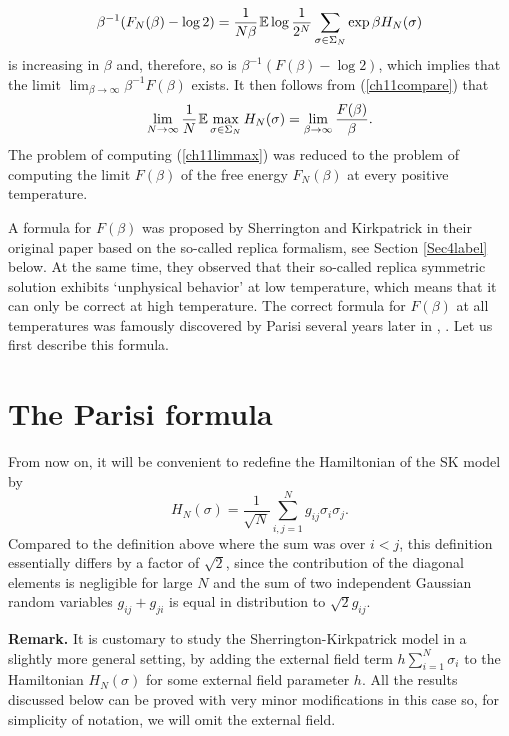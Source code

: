 \documentclass[12pt]{article}
\newcommand{\smsp}{\hspace{0.3mm}}
\newcommand{\e}{\mathbb{E}}
\theoremstyle{nonumberplain}
\begin{document}
$$
\beta^{-1}(F_N(\beta) - \log 2) =
\frac{1}{N\beta}\smsp \e \log \frac{1}{2^{N}}\sum_{\sigma\in\Sigma_N} \exp \beta H_N(\sigma)
$$
is increasing in $\beta$ and, therefore, so is $\beta^{-1}(F(\beta) - \log 2)$, which  implies that the limit $\lim_{\beta\to\infty}\beta^{-1} F(\beta)$ exists. It then follows from (\ref{ch11compare}) that
\begin{equation}
\lim_{N\to\infty} \frac{1}{N}\smsp \e \max_{\sigma\in\Sigma_N} H_N(\sigma)
=
\lim_{\beta\to\infty}\frac{F(\beta)}{\beta}.
\label{ch11limmaxF}
\end{equation}
The problem of computing (\ref{ch11limmax}) was reduced to the problem of computing the limit $F(\beta)$ of the free energy $F_N(\beta)$ at every positive temperature. 

A formula for $F(\beta)$ was proposed by Sherrington and Kirkpatrick in their original paper \cite{SK} based on the so-called replica formalism, see Section \ref{Sec4label} below. At the same time, they observed that their so-called replica symmetric solution exhibits `unphysical behavior' at low temperature, which means that it can only be correct at high temperature. The correct formula for $F(\beta)$ at all temperatures was famously discovered by Parisi several years later in \cite{Parisi79}, \cite{Parisi}. Let us first describe this formula.






\section{The Parisi formula}

From now on, it will be convenient to redefine the Hamiltonian of the SK model by 
\begin{equation}
H_N(\sigma) = \frac{1}{\sqrt{N}} \sum_{i,j =1}^N g_{ij}\sigma_i \sigma_j.
\label{SKH}
\end{equation}
Compared to the definition above where the sum was over $i<j$, this definition essentially differs by a factor of $\sqrt{2}$, since the contribution of the diagonal elements is negligible for large $N$ and the sum of two independent Gaussian random variables $g_{ij}+g_{ji}$ is equal in distribution to $\sqrt{2} g_{ij}$.

\medskip
\noindent
\textbf{Remark.} It is customary to study the Sherrington-Kirkpatrick model in a slightly more general setting, by adding the external field term $h \sum_{i=1}^N \sigma_i$ to the Hamiltonian $H_N(\sigma)$ for some external field parameter $h.$ All the results discussed below can be proved with very minor modifications in this case so, for simplicity of notation, we will omit the external field. 
\end{document}
